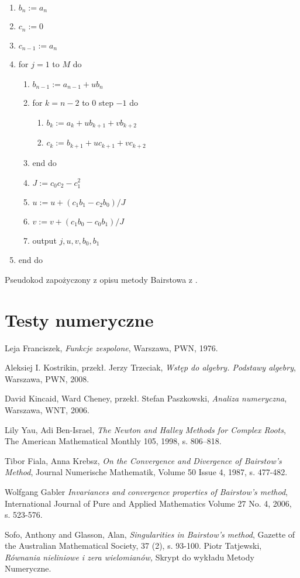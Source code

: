 \documentclass{article}
\begin{document}
\begin{enumerate}
\item $b_n := a_n$
\item $c_n := 0$
\item $c_{n-1} := a_n$
\item for $j = 1$ to $M$ do
	\begin{enumerate}
	\item $b_{n-1} := a_{n-1} + ub_n$
	\item for $k = n-2$ to $0$ step $-1$ do
		\begin{enumerate}
		\item $b_k := a_k + ub_{k+1} + vb_{k+2}$
		\item $c_k := b_{k+1} + uc_{k+1} + vc_{k+2}$
		\end{enumerate}
	\item end do

\item $J := c_0c_2 - c_1^2$
\item $u := u + (c_1b_1 - c_2b_0)/J$
\item $v := v + (c_1b_0 - c_0b_1)/J$
\item output $j, u, v, b_0, b_1$
\end{enumerate}
\item end do	
\end{enumerate}

Pseudokod zapożyczony z opisu metody Bairstowa z \cite{kincaid}.

\section{Testy numeryczne}


\begin{thebibliography}{99}
 Leja Franciszek,
\emph{Funkcje zespolone},
Warszawa, PWN, 1976.

 Aleksiej I. Kostrikin, przekł. Jerzy Trzeciak,
\emph{Wstęp do algebry. Podstawy algebry},
Warszawa, PWN, 2008.

 David Kincaid, Ward Cheney, przekł. Stefan Paszkowski,
\emph{Analiza numeryczna},
Warszawa, WNT, 2006.

Lily Yau, Adi Ben-Israel,
\emph{The Newton and Halley Methods for Complex Roots},
The American Mathematical Monthly 105, 1998, s. 806–818.

Tibor Fiala, Anna Krebsz,
\emph{On the Convergence and Divergence of Bairstow's Method},
Journal Numerische Mathematik, Volume 50 Issue 4, 1987, s. 477-482.

Wolfgang Gabler
\emph{Invariances and convergence properties of Bairstow's method},
International Journal of Pure and Applied Mathematics Volume 27 No. 4, 2006, s. 523-576.

Sofo, Anthony and Glasson, Alan,
\emph{Singularities in Bairstow’s method},
Gazette of the Australian Mathematical Society, 37 (2), s. 93-100.
Piotr Tatjewski,
\emph{Równania nieliniowe i zera wielomianów,}
Skrypt do wykładu Metody Numeryczne.

\end{thebibliography}
\end{document}
